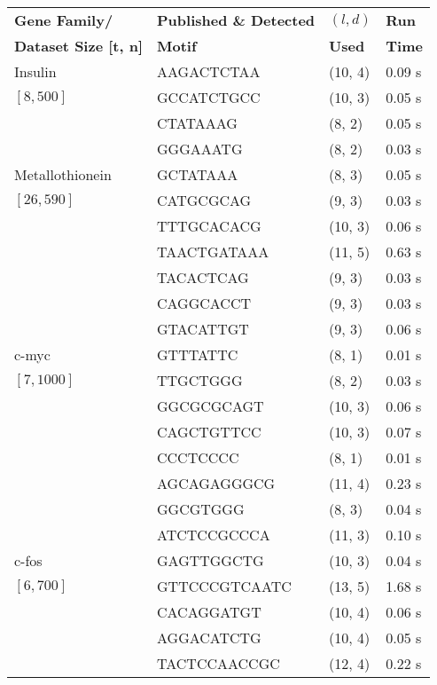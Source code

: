 \begin{table}[h] %
	\renewcommand{\arraystretch}{1.3}
	\centering
	\begin{tabular}{|l|l|l|l|}
	\hline 
	\bfseries Gene Family/ &
	\bfseries Published \& Detected & 
	\bfseries $(l, d)$ & 
	\bfseries Run\\

	\bfseries Dataset Size [t, n] &
	\bfseries Motif & 
	\bfseries Used &
	\bfseries Time\\

	\hline
	 Insulin 		& AAGACTCTAA  	& (10, 4) & 0.09 s \\ 
	 $[8, 500]$		& GCCATCTGCC  	& (10, 3) & 0.05 s \\ 
	  				& CTATAAAG  	& (8, 2) & 0.05 s \\ 
	  				& GGGAAATG  	& (8, 2) & 0.03 s \\ 

	 Metallothionein 	& GCTATAAA  & (8, 3) & 0.05 s \\ 
	 $[26, 590]$		& CATGCGCAG  & (9, 3) & 0.03 s \\ 
						& TTTGCACACG  & (10, 3) & 0.06 s \\ 
						& TAACTGATAAA  & (11, 5) & 0.63 s \\ 
						& TACACTCAG  & (9, 3) & 0.03 s \\ 
						& CAGGCACCT  & (9, 3) & 0.03 s \\ 
						& GTACATTGT  & (9, 3) & 0.06 s \\ 

	 c-myc 			& GTTTATTC  & (8, 1) & 0.01 s \\ 
	 $[7, 1000]$	& TTGCTGGG  & (8, 2) & 0.03 s \\ 
					& GGCGCGCAGT  & (10, 3) & 0.06 s \\ 
					& CAGCTGTTCC  & (10, 3) & 0.07 s \\ 
					& CCCTCCCC  & (8, 1) & 0.01 s \\ 
					& AGCAGAGGGCG  & (11, 4) & 0.23 s \\ 
					& GGCGTGGG  & (8, 3) & 0.04 s \\ 
					& ATCTCCGCCCA  & (11, 3) & 0.10 s \\ 

	 c-fos 			& GAGTTGGCTG  & (10, 3) & 0.04 s \\ 
	 $[6, 700]$ 	& GTTCCCGTCAATC  & (13, 5) & 1.68 s \\ 
					& CACAGGATGT  & (10, 4) & 0.06 s \\ 
					& AGGACATCTG  & (10, 4) & 0.05 s \\ 
					& TACTCCAACCGC  & (12, 4) & 0.22 s \\ 


\end{tabular}
\end{table}
